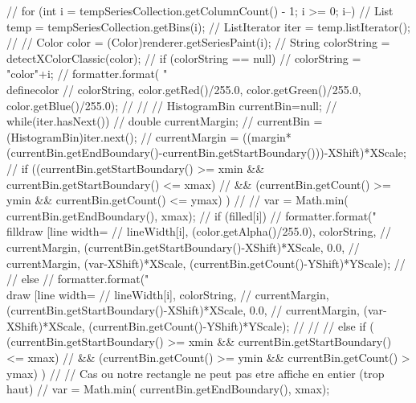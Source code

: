 \begin{code}
\begin{hide}
{//       for (int i = tempSeriesCollection.getColumnCount() - 1; i >= 0; i--) {
//          List temp = tempSeriesCollection.getBins(i);
//          ListIterator iter = temp.listIterator();
//          
//          Color color = (Color)renderer.getSeriesPaint(i);
//          String colorString = detectXColorClassic(color);
//          if (colorString == null) {
//             colorString = "color"+i;
//             formatter.format( "\\definecolor{%
//                               colorString, color.getRed()/255.0, color.getGreen()/255.0, color.getBlue()/255.0);
//          }
//          
//          HistogramBin currentBin=null;
//          while(iter.hasNext()) {
//             double currentMargin;
//             currentBin = (HistogramBin)iter.next();
//             currentMargin = ((margin*(currentBin.getEndBoundary()-currentBin.getStartBoundary()))-XShift)*XScale;
//             if ((currentBin.getStartBoundary() >= xmin && currentBin.getStartBoundary() <= xmax) 
//                && (currentBin.getCount() >= ymin && currentBin.getCount() <= ymax) )
//             {
//                var = Math.min( currentBin.getEndBoundary(), xmax);
//                if (filled[i]) {
//                   formatter.format("\\filldraw [line width=%
//                         lineWidth[i], (color.getAlpha()/255.0), colorString,
//                         currentMargin, (currentBin.getStartBoundary()-XShift)*XScale, 0.0,
//                         currentMargin, (var-XShift)*XScale, (currentBin.getCount()-YShift)*YScale);
//               }
//               else {
//                   formatter.format("\\draw [line width=%
//                         lineWidth[i], colorString,
//                         currentMargin, (currentBin.getStartBoundary()-XShift)*XScale, 0.0,
//                         currentMargin, (var-XShift)*XScale, (currentBin.getCount()-YShift)*YScale);
//               }
//             }
//             else if (   (currentBin.getStartBoundary() >= xmin && currentBin.getStartBoundary() <= xmax) 
//                         && (currentBin.getCount() >= ymin && currentBin.getCount() > ymax) )
//             { // Cas ou notre rectangle ne peut pas etre affiche en entier (trop haut)
//                var = Math.min( currentBin.getEndBoundary(), xmax);
}}}}}
\end{hide}
\end{code}
